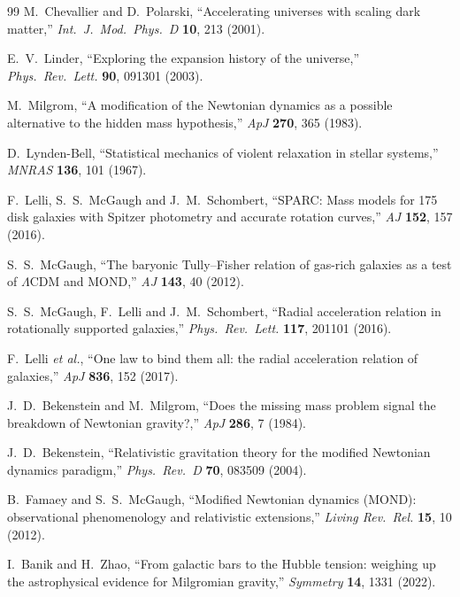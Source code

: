 \documentclass[aps,prd,twocolumn,nofootinbib,floatfix,superscriptaddress]{revtex4-2}
\begin{document}
\begin{thebibliography}{99}
 M.~Chevallier and D.~Polarski,
``Accelerating universes with scaling dark matter,''
\textit{Int.~J.~Mod.~Phys.~D} \textbf{10}, 213 (2001).

 E.~V.~Linder, ``Exploring the expansion history
of the universe,'' \textit{Phys.~Rev.~Lett.} \textbf{90}, 091301
(2003).


 M.~Milgrom, ``A modification of the Newtonian
dynamics as a possible alternative to the hidden mass hypothesis,''
\textit{ApJ} \textbf{270}, 365 (1983).

 D.~Lynden-Bell, ``Statistical mechanics of
violent relaxation in stellar systems,''
\textit{MNRAS} \textbf{136}, 101 (1967).

 F.~Lelli, S.~S.~McGaugh and J.~M.~Schombert,
``SPARC: Mass models for 175 disk galaxies with Spitzer photometry
and accurate rotation curves,'' \textit{AJ} \textbf{152}, 157 (2016).

 S.~S.~McGaugh, ``The baryonic Tully--Fisher
relation of gas-rich galaxies as a test of $\Lambda$CDM and MOND,''
\textit{AJ} \textbf{143}, 40 (2012).

 S.~S.~McGaugh, F.~Lelli and
J.~M.~Schombert, ``Radial acceleration relation in rotationally
supported galaxies,'' \textit{Phys.~Rev.~Lett.} \textbf{117}, 201101
(2016).

 F.~Lelli \emph{et al.}, ``One law to bind
them all: the radial acceleration relation of galaxies,''
\textit{ApJ} \textbf{836}, 152 (2017).

 J.~D.~Bekenstein and M.~Milgrom, ``Does the
missing mass problem signal the breakdown of Newtonian gravity?,''
\textit{ApJ} \textbf{286}, 7 (1984).

 J.~D.~Bekenstein, ``Relativistic
gravitation theory for the modified Newtonian dynamics paradigm,''
\textit{Phys.~Rev.~D} \textbf{70}, 083509 (2004).

 B.~Famaey and S.~S.~McGaugh, ``Modified
Newtonian dynamics (MOND): observational phenomenology and
relativistic extensions,'' \textit{Living Rev.~Rel.} \textbf{15}, 10
(2012).

 I.~Banik and H.~Zhao, ``From galactic bars to
the Hubble tension: weighing up the astrophysical evidence for
Milgromian gravity,'' \textit{Symmetry} \textbf{14}, 1331 (2022).


\end{thebibliography}
\end{document}

